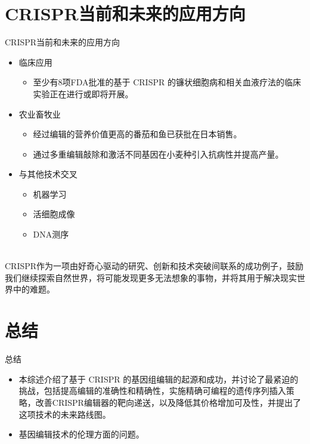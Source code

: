 \documentclass{beamer}
\begin{document}

	\section{CRISPR当前和未来的应用方向}
	\begin{frame}{CRISPR当前和未来的应用方向}
		\begin{itemize}
			\item 临床应用
			\begin{itemize}
				\item 至少有8项FDA批准的基于 CRISPR 的镰状细胞病和相关血液疗法的临床实验正在进行或即将开展。
			\end{itemize}
			\item 农业畜牧业
			\begin{itemize}
				\item 经过编辑的营养价值更高的番茄和鱼已获批在日本销售。
				\item 通过多重编辑敲除和激活不同基因在小麦种引入抗病性并提高产量。
			\end{itemize}
			\item 与其他技术交叉
			\begin{itemize}
				\item 机器学习
				\item 活细胞成像
				\item DNA测序
			\end{itemize}
		\end{itemize}

		\quad\\

		CRISPR作为一项由好奇心驱动的研究、创新和技术突破间联系的成功例子，鼓励我们继续探索自然世界，将可能发现更多无法想象的事物，并将其用于解决现实世界中的难题。
	\end{frame}



	\section*{总结}
	\begin{frame}{总结}
		\begin{itemize}
			\item 本综述介绍了基于 CRISPR 的基因组编辑的起源和成功，并讨论了最紧迫的挑战，包括提高编辑的准确性和精确性，实施精确可编程的遗传序列插入策略，改善CRISPR编辑器的靶向递送，以及降低其价格增加可及性，并提出了这项技术的未来路线图。
			\item 基因编辑技术的伦理方面的问题。
		\end{itemize}
	
	\end{frame}
\end{document}
